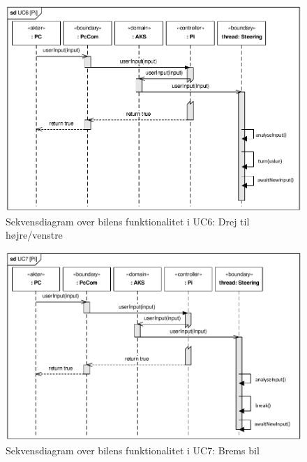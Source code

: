 \begin{figure}[h]
\centering
\includegraphics[]{../fig/diagrammer/bil/sd_uc6.pdf}
\caption{Sekvensdiagram over  bilens funktionalitet i UC6: Drej til højre/venstre}
\label{fig:sd_uc6_bil}
\end{figure}

\begin{figure}[h]
\centering
\includegraphics[]{../fig/diagrammer/bil/sd_uc7.pdf}
\caption{Sekvensdiagram over  bilens funktionalitet i UC7: Brems bil}
\label{fig:sd_uc7_bil}
\end{figure}

